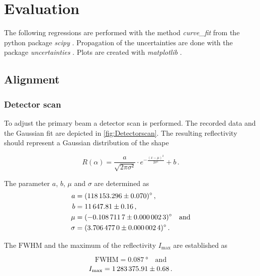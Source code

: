 \section{Evaluation}
\label{sec:auswertung}

%
The following regressions are performed with the method \textit{curve\_fit} from the python \cite{py} package \textit{scipy} \cite{scipy}.
Propagation of the uncertainties are done with the package \textit{uncertainties} \cite{uncertainties}.
Plots are created with \textit{matplotlib} \cite{matplotlib}.

\subsection{Alignment}

\subsubsection{Detector scan}

To adjust the primary beam a detector scan is performed.
The recorded data and the Gaussian fit are depicted in \autoref{fig:Detectorscan}.
The resulting reflectivity should represent a Gaussian distribution of the shape

\begin{equation*}
    R\left(\alpha\right) = \frac{a}{\sqrt{2\pi\sigma²}} \cdot e^{-\frac{\left(x -\mu\right)^2}{2\sigma^2}} + b \,.
\end{equation*}

The parameter $a$, $b$, $\mu$ and $\sigma$ are determined as 
\begin{align*}
    a &=  \SI{118153.296 \pm 0.070}{\degree}\,, \\
    b & = \num{11647.81 \pm 0.16}\,, \\
    \mu    &= \SI{ -0.1087117 \pm   0.0000023}{\degree}\quad \text{and} \\
    \sigma &= \SI{  3.706477 \pm  0.0000024}{\degree}\,. \\
\end{align*}

The $\text{FWHM}$ and the maximum of the reflectivity $I_\text{max}$ are established as 

\begin{equation*}
    \text{FWHM} = \SI{0.087}{\degree} \quad \text{and}
\end{equation*}
\begin{equation*}
    I_{\text{max}} = \num{1283375.91 \pm 0.68}\,.
\end{equation*}


